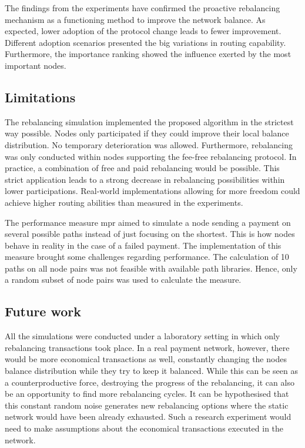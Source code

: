 \documentclass[final]{fhnwreport}       %
\begin{document}
The findings from the experiments have confirmed the proactive rebalancing mechanism as a functioning method to improve the network balance. As expected, lower adoption of the protocol change leads to fewer improvement. Different adoption scenarios presented the big variations in routing capability. Furthermore, the importance ranking showed the influence exerted by the most important nodes.

\subsection{Limitations}
The rebalancing simulation implemented the proposed algorithm in the strictest way possible. Nodes only participated if they could improve their local balance distribution. No temporary deterioration was allowed. Furthermore, rebalancing was only conducted within nodes supporting the fee-free rebalancing protocol. In practice, a combination of free and paid rebalancing would be possible. This strict application leads to a strong decrease in rebalancing possibilities within lower participations. Real-world implementations allowing for more freedom could achieve higher routing abilities than measured in the experiments.

The performance measure \gls{mpr} aimed to simulate a node sending a payment on several possible paths instead of just focusing on the shortest. This is how nodes behave in reality in the case of a failed payment. The implementation of this measure brought some challenges regarding performance. The calculation of 10 paths on all node pairs was not feasible with available path libraries. Hence, only a random subset of node pairs was used to calculate the measure.

\subsection{Future work}
All the simulations were conducted under a laboratory setting in which only rebalancing transactions took place. In a real payment network, however, there would be more economical transactions as well, constantly changing the nodes balance distribution while they try to keep it balanced. While this can be seen as a counterproductive force, destroying the progress of the rebalancing, it can also be an opportunity to find more rebalancing cycles. It can be hypothesised that this constant random noise generates new rebalancing options where the static network would have been already exhausted. Such a research experiment would need to make assumptions about the economical transactions executed in the network.
\end{document}
